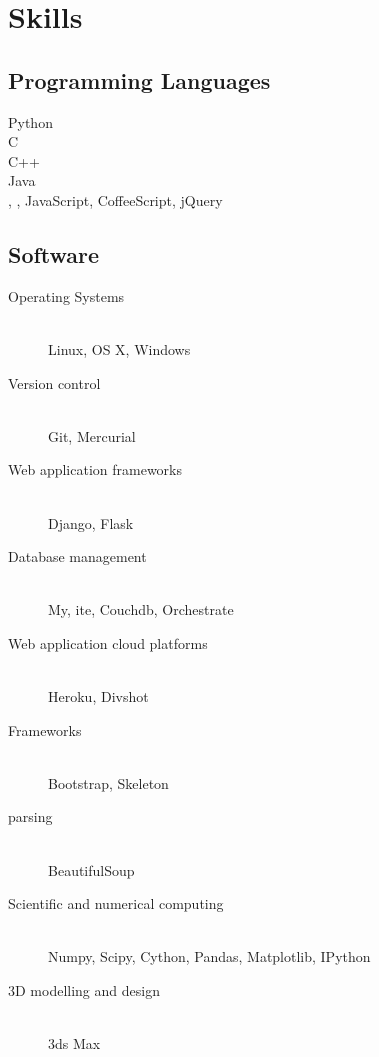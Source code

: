 \documentclass[10pt]{article}
\begin{document}
    \newpage

    \section{Skills}

        \subsection{Programming Languages}
            \begin{description}
                \item[Python]
                \item[C]
                \item[C++]
                \item[Java]
                \item[, , JavaScript, CoffeeScript, jQuery]
                \item[]
            \end{description}

        \subsection{Software}
            \begin{description}
                \item[Operating Systems] \hfill \\
                    Linux, OS X, Windows
                \item[Version control] \hfill \\
                    Git, Mercurial
                \item[Web application frameworks] \hfill \\
                    Django, Flask
                \item[Database management] \hfill \\
                    My, ite, Couchdb, Orchestrate
                \item[Web application cloud platforms] \hfill \\
                    Heroku, Divshot
                \item[ Frameworks] \hfill \\
                    Bootstrap, Skeleton
                \item[ parsing] \hfill \\
                    BeautifulSoup
                \item[Scientific and numerical computing] \hfill \\
                    Numpy, Scipy, Cython, Pandas, Matplotlib, IPython
                \item[3D modelling and design] \hfill \\
                    3ds Max
            \end{description}
\end{document}

